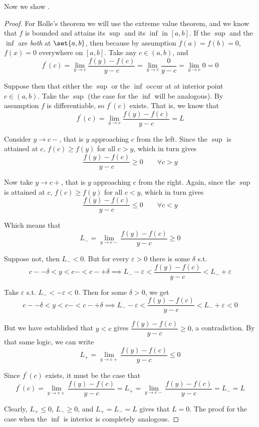 \documentclass{article}
\begin{document}
Now we show .
\begin{proof}
    For Rolle's theorem we will use the extreme value theorem, and we know that $f$ is bounded and attains its $\sup$ and its $\inf$ in $[a, b]$. If the $\sup$ and the $\inf$ are \textit{both} at $\set{a, b}$, then because by assumption $f(a) = f(b) = 0$, $f(x) = 0$ everywhere on $[a, b]$. Take any $c \in (a, b)$, and
    \[
        f^\prime(c)
        = \lim_{y \to c} \dfrac{f(y) - f(c)}{y - c}
        = \lim_{y \to c} \dfrac{0}{y - c}
        = \lim_{y \to c} 0 = 0
    \]

    Suppose then that either the $\sup$ or the $\inf$ occur at at interior point $c \in (a, b)$. Take the $\sup$ (the case for the $\inf$ will be analogous). By assumption $f$ is differentiable, so $f^\prime(c)$ exists. That is, we know that
    \[
        f^\prime(c)
        = \lim_{y \to c} \dfrac{f(y) - f(c)}{y - c}
        = L
    \]

    Consider $y \to c-$, that is $y$ approaching $c$ from the left. Since the $\sup$ is attained at $c$, $f(c) \ge f(y)$ for all $c > y$, which in turn gives
    \[
        \dfrac{f(y) - f(c)}{y - c} \ge 0
        \quad\quad
        \forall c > y
    \]

    Now take $y \to c+$, that is $y$ approaching $c$ from the right. Again, since the $\sup$ is attained at $c$, $f(c) \ge f(y)$ for all $c < y$, which in turn gives
    \[
        \dfrac{f(y) - f(c)}{y - c} \le 0
        \quad\quad
        \forall c < y
    \]

    Which means that
    \[
        L_- = \lim_{y \to c-} \dfrac{f(y) - f(c)}{y - c} \ge 0
    \]

    Suppose not, then $L_- < 0$. But for every $\varepsilon > 0$ there is some $\delta$ s.t.
    \[
        c- - \delta < y < c- < c- + \delta
        \implies
        L_- - \varepsilon < \dfrac{f(y) - f(c)}{y - c} < L_- + \varepsilon
    \]

    Take $\varepsilon$ s.t. $L_- < - \varepsilon < 0$. Then for some $\delta > 0$, we get
    \[
        c- - \delta < y < c- < c- + \delta
        \implies
        L_- - \varepsilon < \dfrac{f(y) - f(c)}{y - c} < L_- + \varepsilon < 0
    \]

    But we have established that $y < c$ gives $\dfrac{f(y) - f(c)}{y - c} \ge 0$, a contradiction. By that same logic, we can write
    \[
        L_+ = \lim_{y \to c+} \dfrac{f(y) - f(c)}{y - c} \le 0
    \]

    Since $f^\prime(c)$ exists, it must be the case that
    \[
        f^\prime(c)
        = \lim_{y \to c+} \dfrac{f(y) - f(c)}{y - c}
        = L_+
        = \lim_{y \to c-} \dfrac{f(y) - f(c)}{y - c}
        = L_-
        = L
    \]

    Clearly, $L_+ \le 0$, $L_- \ge 0$, and $L_+ = L_- = L$  gives that $L = 0$. The proof for the case when the $\inf$ is interior is completely analogous.
\end{proof}
\end{document}
